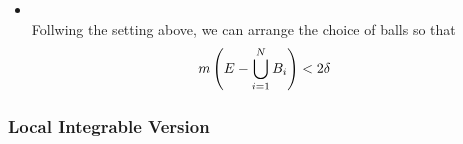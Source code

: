 \documentclass[11pt]{article}
\begin{document}
\begin{itemize}
\begin{remark}
\begin{itemize}
\item \begin{corollary} \citep{stein2009real, royden1988real}\\
Follwing the setting above, we can arrange the choice of balls so that
\begin{align*}
m\left(E- \bigcup_{i=1}^{N}B_{i}\right) &< 2\delta
\end{align*}
\end{corollary}
\end{itemize}
\end{remark}
\end{itemize}

\subsubsection{Local Integrable Version}
\end{document}
